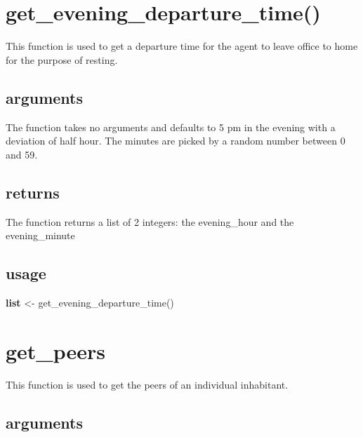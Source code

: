\documentclass[]{book}
\newenvironment{Shaded}{\begin{snugshade}}{\end{snugshade}}
\newcommand{\KeywordTok}[1]{\textcolor[rgb]{0.13,0.29,0.53}{\textbf{#1}}}
\newcommand{\NormalTok}[1]{#1}
\newcommand{\OtherTok}[1]{\textcolor[rgb]{0.56,0.35,0.01}{#1}}
\theoremstyle{definition}
\theoremstyle{definition}
\theoremstyle{definition}
\theoremstyle{remark}
\begin{document}
\hypertarget{get_evening_departure_time}{%
\section{get\_evening\_departure\_time()}\label{get_evening_departure_time}}

This function is used to get a departure time for the agent to leave
office to home for the purpose of resting.

\hypertarget{arguments-5}{%
\subsection*{arguments}\label{arguments-5}}

The function takes no arguments and defaults to 5 pm in the evening with
a deviation of half hour. The minutes are picked by a random number
between 0 and 59.

\hypertarget{returns-5}{%
\subsection*{returns}\label{returns-5}}

The function returns a list of 2 integers: the evening\_hour and the
evening\_minute

\hypertarget{usage-5}{%
\subsection*{usage}\label{usage-5}}

\begin{Shaded}
\begin{Highlighting}[]
\KeywordTok{list}\NormalTok{ <- get_evening_departure_time}\OtherTok{()}
\end{Highlighting}
\end{Shaded}

\hypertarget{get_peers}{%
\section{get\_peers}\label{get_peers}}

This function is used to get the peers of an individual inhabitant.

\hypertarget{arguments-6}{%
\subsection*{arguments}\label{arguments-6}}
\end{document}
